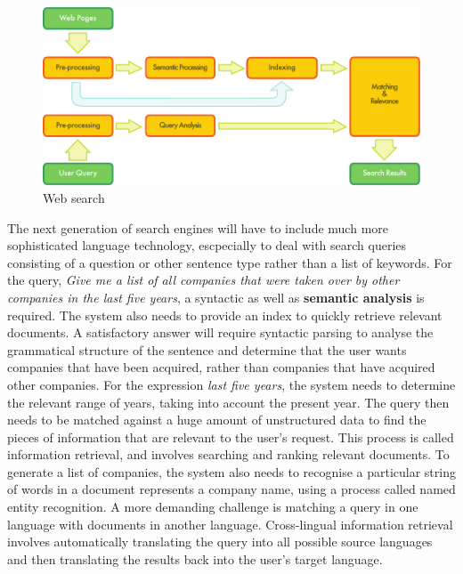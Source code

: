 \begin{multicols}{2}
\begin{figure}[t]
  \center
  \includegraphics[width=\textwidth]{../_media/english/web_search_architecture}
  \caption{Web search}
  \label{fig:websearcharch_en}
 \end{figure}


The next generation of search engines will have to include much more sophisticated language technology, escpecially to deal with search queries consisting of a question or other sentence type rather than a list of keywords. For the query, \emph{Give me a list of all companies that were taken over by other companies in the last five years}, a syntactic as well as \textbf{semantic analysis} is required. The system also needs to provide an index to quickly retrieve relevant documents. A satisfactory answer will require syntactic parsing to analyse the grammatical structure of the sentence and determine that the user wants companies that have been acquired, rather than companies that have acquired other companies. For the expression \emph{last five years}, the system needs to determine the relevant range of years, taking into account the present year. The query then needs to be matched against a huge amount of unstructured data to find the pieces of information that are relevant to the user’s request. This process is called information retrieval, and involves searching and ranking relevant documents. To generate a list of companies, the system also needs to recognise a particular string of words in a document represents a company name, using a process called named entity recognition. A more demanding challenge is matching a query in one language with documents in another language. Cross-lingual information retrieval involves automatically translating the query into all possible source languages and then translating the results back into the user’s target language.


\end{multicols}
